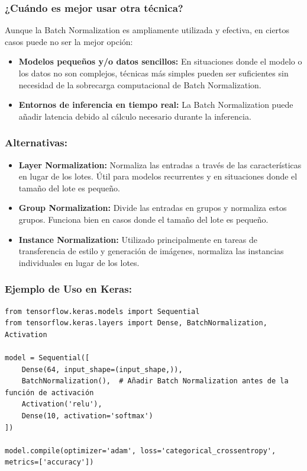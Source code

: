 \documentclass[11pt]{article}
\begin{document}
\subsubsection{¿Cuándo es mejor usar otra técnica?}
\label{sec:orgad778a7}
Aunque la Batch Normalization es ampliamente utilizada y efectiva, en
ciertos casos puede no ser la mejor opción:

\begin{itemize}
\item \textbf{Modelos pequeños y/o datos sencillos:} En situaciones donde el modelo
o los datos no son complejos, técnicas más simples pueden ser
suficientes sin necesidad de la sobrecarga computacional de Batch
Normalization.
\item \textbf{Entornos de inferencia en tiempo real:} La Batch Normalization puede
añadir latencia debido al cálculo necesario durante la inferencia.
\end{itemize}

\subsubsection{Alternativas:}
\label{sec:org44cd733}
\begin{itemize}
\item \textbf{Layer Normalization:} Normaliza las entradas a través de las
características en lugar de los lotes. Útil para modelos recurrentes y
en situaciones donde el tamaño del lote es pequeño.
\item \textbf{Group Normalization:} Divide las entradas en grupos y normaliza estos
grupos. Funciona bien en casos donde el tamaño del lote es pequeño.
\item \textbf{Instance Normalization:} Utilizado principalmente en tareas de
transferencia de estilo y generación de imágenes, normaliza las
instancias individuales en lugar de los lotes.
\end{itemize}

\subsubsection{Ejemplo de Uso en Keras:}
\label{sec:orgaa38ffd}
\begin{verbatim}
from tensorflow.keras.models import Sequential
from tensorflow.keras.layers import Dense, BatchNormalization, Activation

model = Sequential([
    Dense(64, input_shape=(input_shape,)),
    BatchNormalization(),  # Añadir Batch Normalization antes de la función de activación
    Activation('relu'),
    Dense(10, activation='softmax')
])

model.compile(optimizer='adam', loss='categorical_crossentropy', metrics=['accuracy'])
\end{verbatim}
\end{document}
